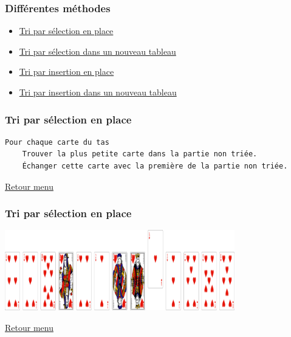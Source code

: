 \documentclass[svgnames,11pt]{beamer}
\begin{document}
\begin{frame}[label=menu]
    \frametitle{\hypertarget{menu}{Différentes méthodes}}

    \begin{itemize}
        \item \hyperlink{selection1}{Tri par sélection en place}
        \item \hyperlink{selection2}{Tri par sélection dans un nouveau tableau}
        \item \hyperlink{insertion1}{Tri par insertion en place}
        \item \hyperlink{insertion2}{Tri par insertion dans un nouveau tableau}
    \end{itemize}

\end{frame}
\begin{frame}[fragile]
    \frametitle{\hypertarget{selection1}{Tri par sélection en place}
    }
    \begin{center}
        \begin{lstlisting}[language=bash, basicstyle=\small]
Pour chaque carte du tas
    Trouver la plus petite carte dans la partie non triée.
    Échanger cette carte avec la première de la partie non triée.
        \end{lstlisting}
        \label{CODE}
    \end{center}
\hyperlink{menu}{Retour menu}
\end{frame}
\begin{frame}
    \frametitle{Tri par sélection en place}

    \begin{center}
        \centering
        \includegraphics[width=10cm]{ressources/selection-1.png}
        \label{pique}
    \end{center}
    \hyperlink{menu}{Retour menu}

\end{frame}
\end{document}
